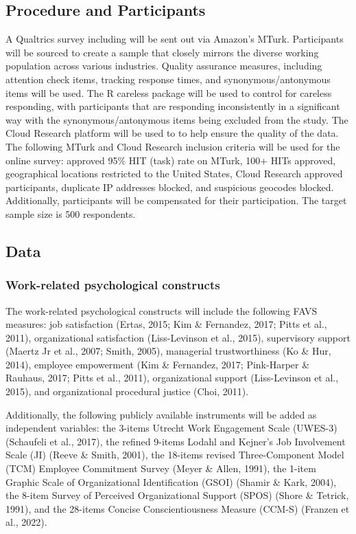 \documentclass[
  man]{apa7}
\begin{document}
\hypertarget{procedure-and-participants-1}{%
\subsection{Procedure and Participants}\label{procedure-and-participants-1}}

A Qualtrics survey including will be sent out via Amazon's MTurk. Participants will be sourced to create a sample that closely mirrors the diverse working population across various industries. Quality assurance measures, including attention check items, tracking response times, and synonymous/antonymous items will be used. The R careless package will be used to control for careless responding, with participants that are responding inconsistently in a significant way with the synonymous/antonymous items being excluded from the study. The Cloud Research platform will be used to to help ensure the quality of the data. The following MTurk and Cloud Research inclusion criteria will be used for the online survey: approved 95\% HIT (task) rate on MTurk, 100+ HITs approved, geographical locations restricted to the United States, Cloud Research approved participants, duplicate IP addresses blocked, and suspicious geocodes blocked. Additionally, participants will be compensated for their participation. The target sample size is 500 respondents.

\hypertarget{data-1}{%
\subsection{Data}\label{data-1}}

\hypertarget{work-related-psychological-constructs}{%
\subsubsection{Work-related psychological constructs}\label{work-related-psychological-constructs}}

The work-related psychological constructs will include the following FAVS measures: job satisfaction (Ertas, 2015; Kim \& Fernandez, 2017; Pitts et al., 2011), organizational satisfaction (Liss-Levinson et al., 2015), supervisory support (Maertz Jr et al., 2007; Smith, 2005), managerial trustworthiness (Ko \& Hur, 2014), employee empowerment (Kim \& Fernandez, 2017; Pink-Harper \& Rauhaus, 2017; Pitts et al., 2011), organizational support (Liss-Levinson et al., 2015), and organizational procedural justice (Choi, 2011).

Additionally, the following publicly available instruments will be added as independent variables: the 3-items Utrecht Work Engagement Scale (UWES-3) (Schaufeli et al., 2017), the refined 9-items Lodahl and Kejner's Job Involvement Scale (JI) (Reeve \& Smith, 2001), the 18-items revised Three-Component Model (TCM) Employee Commitment Survey (Meyer \& Allen, 1991), the 1-item Graphic Scale of Organizational Identification (GSOI) (Shamir \& Kark, 2004), the 8-item Survey of Perceived Organizational Support (SPOS) (Shore \& Tetrick, 1991), and the 28-items Concise Conscientiousness Measure (CCM-S) (Franzen et al., 2022).
\end{document}
